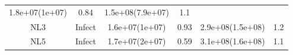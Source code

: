 \documentclass[]{article}
\begin{document}
\begin{longtable}[]{@{}cccccc@{}}
\begin{minipage}[t]{0.16\columnwidth}
1.8e+07(1e+07)\strut
\end{minipage} & \begin{minipage}[t]{0.16\columnwidth}\centering\strut
0.84\strut
\end{minipage} & \begin{minipage}[t]{0.17\columnwidth}\centering\strut
1.5e+08(7.9e+07)\strut
\end{minipage} & \begin{minipage}[t]{0.12\columnwidth}\centering\strut
1.1\strut
\end{minipage}\tabularnewline
\begin{minipage}[t]{0.12\columnwidth}\centering\strut
NL3\strut
\end{minipage} & \begin{minipage}[t]{0.12\columnwidth}\centering\strut
Infect\strut
\end{minipage} & \begin{minipage}[t]{0.16\columnwidth}\centering\strut
1.6e+07(1e+07)\strut
\end{minipage} & \begin{minipage}[t]{0.16\columnwidth}\centering\strut
0.93\strut
\end{minipage} & \begin{minipage}[t]{0.17\columnwidth}\centering\strut
2.9e+08(1.5e+08)\strut
\end{minipage} & \begin{minipage}[t]{0.12\columnwidth}\centering\strut
1.2\strut
\end{minipage}\tabularnewline
\begin{minipage}[t]{0.12\columnwidth}\centering\strut
NL5\strut
\end{minipage} & \begin{minipage}[t]{0.12\columnwidth}\centering\strut
Infect\strut
\end{minipage} & \begin{minipage}[t]{0.16\columnwidth}\centering\strut
1.7e+07(2e+07)\strut
\end{minipage} & \begin{minipage}[t]{0.16\columnwidth}\centering\strut
0.59\strut
\end{minipage} & \begin{minipage}[t]{0.17\columnwidth}\centering\strut
3.1e+08(1.6e+08)\strut
\end{minipage} & \begin{minipage}[t]{0.12\columnwidth}\centering\strut
1.1\strut
\end{minipage}\tabularnewline

\end{longtable}
\end{document}
